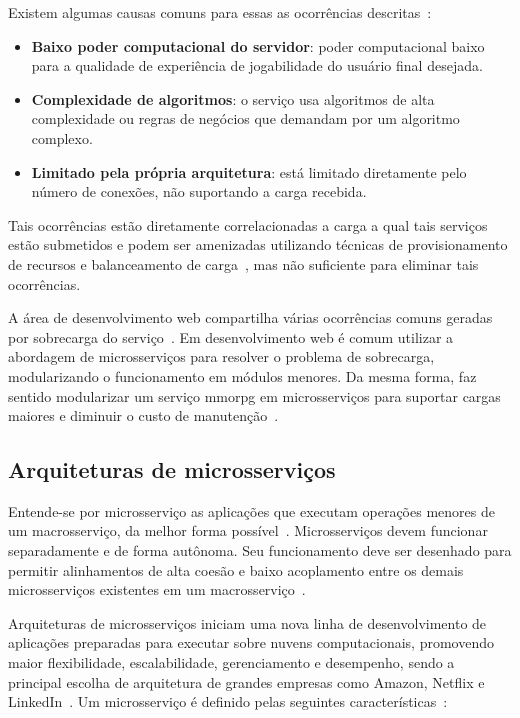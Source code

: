 Existem algumas causas comuns para essas as ocorrências descritas~\cite{1417630}:

\begin{itemize}
  \item \textbf{Baixo poder computacional do servidor}: poder computacional baixo para a qualidade de experiência de jogabilidade do usuário final desejada.
  \item \textbf{Complexidade de algoritmos}: o serviço usa algoritmos de alta complexidade ou regras de negócios que demandam por um algoritmo complexo.
  \item \textbf{Limitado pela própria arquitetura}: está limitado diretamente pelo número de conexões, não suportando a carga recebida.
\end{itemize}

Tais ocorrências estão diretamente correlacionadas a carga a qual tais serviços estão submetidos e podem ser amenizadas utilizando técnicas de provisionamento de recursos e balanceamento de carga~\cite{1417630}, mas não suficiente para eliminar tais ocorrências.

A área de desenvolvimento web compartilha várias ocorrências comuns geradas por sobrecarga do serviço~\cite{7830692}.
%
Em desenvolvimento web é comum utilizar a abordagem de microsserviços para resolver o problema de sobrecarga, modularizando o  funcionamento em módulos menores.
%
Da mesma forma, faz sentido modularizar um serviço \ac{mmorpg} em microsserviços para suportar cargas maiores e diminuir o custo de manutenção~\cite{7515686}.

\subsection{Arquiteturas de microsserviços}

Entende-se por microsserviço as aplicações que executam operações menores de um macrosserviço, da melhor forma possível~\cite{stephenclarkewillson2017}.
%
Microsserviços devem funcionar separadamente e de forma autônoma.
%
Seu funcionamento deve ser desenhado para permitir alinhamentos de alta coesão e baixo acoplamento entre os demais microsserviços existentes em um macrosserviço~\cite{8169955}.



Arquiteturas de microsserviços iniciam uma nova linha de desenvolvimento de aplicações preparadas para executar sobre nuvens computacionais, promovendo maior flexibilidade, escalabilidade, gerenciamento e desempenho, sendo a principal escolha de arquitetura de grandes empresas como Amazon, Netflix e LinkedIn~\cite{7830692,7515686}.
%
Um microsserviço é definido pelas seguintes características~\cite{8169955}:


